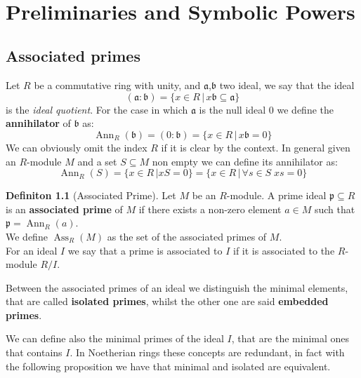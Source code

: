 \documentclass[notitlepage, a4]{book}
\theoremstyle{plain}
\theoremstyle{remark}
\theoremstyle{definition}
\newtheorem{deff}[teo]{Definiton}
\newcommand{\p}{\mathfrak{p}}
\newcommand{\A}{\mathfrak{a}}
\newcommand{\B}{\mathfrak{b}}
\DeclareMathOperator{\Ann}{Ann}
\DeclareMathOperator{\Ass}{Ass}
\begin{document}
  

\mainmatter



\chapter{Preliminaries and Symbolic Powers} \label{cha:pre_sym}


\section{Associated primes}

Let $ R $ be a commutative ring with unity, and $ \A $,$ \B $ two ideal, we say that the ideal
\begin{equation*}
	(\A : \B) = \{ x \in R \,|\, x\B \subseteq \A  \}
\end{equation*}
 \nocite{AMCD}
is the \textit{ideal quotient}. For the case in which $ \A $  is the null ideal $ 0 $ we define the \textbf{annihilator} of $ \B $ as:
\begin{equation*}
	\Ann_R(\B) = (0 : \B) = \{ x \in R \,|\, x\B = 0  \}
\end{equation*}
We can obviously omit the index $ R $ if it is clear by the context. In general given an $ R  $-module $ M $ and a set $ S \subseteq M $ non empty we can define its annihilator as:
\begin{equation*}
	\Ann_R (S) = \{ x \in R \,| xS = 0  \} = \{ x \in R \,|\, \forall s \in S \; xs = 0  \}
\end{equation*}

\begin{deff}[Associated Prime]
Let $ M $ be an $ R $-module. A prime ideal $ \p \subseteq R $ is an \textbf{associated prime} of $ M $ if there exists a non-zero element $ a \in M $ such that $ \p = \Ann_R (a)$. \\
We define $ \Ass_R(M) $ as the set of the associated primes of $ M $.\\
For an ideal $ I $ we say that a prime is associated to $ I $ if it is associated to the $ R $-module $ R/I $.
\end{deff}

Between the associated primes of an ideal we distinguish the minimal elements, that are called \textbf{isolated primes}, whilst the other one are said \textbf{embedded primes}.

We can define also the minimal primes of the ideal $ I $, that are the minimal ones that contains $ I $. In Noetherian rings these concepts are redundant, in fact with the following proposition we have that minimal and isolated are equivalent. 
\end{document}
